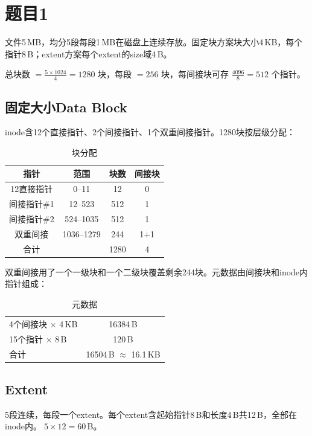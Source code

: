 \documentclass[fleqn]{ctexart}
\begin{document}
\section*{题目1}

文件5\,MB，均分5段每段1\,MB在磁盘上连续存放。固定块方案块大小4\,KB，每个指针8\,B；extent方案每个extent的size域4\,B。

总块数 $=\frac{5\times1024}{4}=1280$ 块，每段 $=256$ 块，每间接块可存 $\frac{4096}{8}=512$ 个指针。

\subsection*{固定大小Data Block}

inode含12个直接指针、2个间接指针、1个双重间接指针。1280块按层级分配：

\begin{table}[H]
\centering
\caption{块分配}\label{tab:alloc}
\begin{tabular}{c|c|c|c}
\hline
指针 & 范围 & 块数 & 间接块 \\
\hline
12直接指针       & 0--11    & 12   & 0 \\
间接指针\#1     & 12--523  & 512  & 1 \\
间接指针\#2     & 524--1035 & 512  & 1 \\
双重间接        & 1036--1279 & 244 & 1+1 \\
\hline
合计            &          & 1280 & 4 \\
\hline
\end{tabular}
\end{table}

双重间接用了一个一级块和一个二级块覆盖剩余244块。元数据由间接块和inode内指针组成：

\begin{table}[H]
\centering
\caption{元数据}
\begin{tabular}{l|c}
\hline
4个间接块 $\times$ 4\,KB & 16384\,B \\
15个指针 $\times$ 8\,B   & 120\,B \\
\hline
合计                     & 16504\,B $\approx$ 16.1\,KB \\
\hline
\end{tabular}
\end{table}

\subsection*{Extent}

5段连续，每段一个extent。每个extent含起始指针8\,B和长度4\,B共12\,B，全部在inode内。$\;5\times12=60$\,B。
\end{document}
